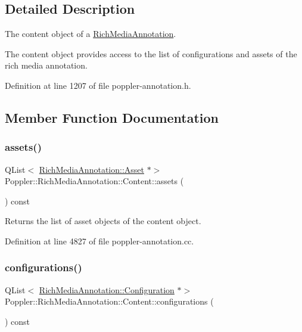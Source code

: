 \subsection{Detailed Description}
The content object of a \hyperlink{class_poppler_1_1_rich_media_annotation}{Rich\+Media\+Annotation}.

The content object provides access to the list of configurations and assets of the rich media annotation. 

Definition at line 1207 of file poppler-\/annotation.\+h.



\subsection{Member Function Documentation}
\mbox{\label{class_poppler_1_1_rich_media_annotation_1_1_content_a64b6bd21fb70aeed088ac1e0ce94eea4}} 
\subsubsection{\texorpdfstring{assets()}{assets()}}
{\footnotesize\ttfamily Q\+List$<$ \hyperlink{class_poppler_1_1_rich_media_annotation_1_1_asset}{Rich\+Media\+Annotation\+::\+Asset} $\ast$$>$ Poppler\+::\+Rich\+Media\+Annotation\+::\+Content\+::assets (\begin{DoxyParamCaption}{ }\end{DoxyParamCaption}) const}

Returns the list of asset objects of the content object. 

Definition at line 4827 of file poppler-\/annotation.\+cc.

\mbox{\label{class_poppler_1_1_rich_media_annotation_1_1_content_aa05b36aa207a96c00abb651c5df80282}} 
\subsubsection{\texorpdfstring{configurations()}{configurations()}}
{\footnotesize\ttfamily Q\+List$<$ \hyperlink{class_poppler_1_1_rich_media_annotation_1_1_configuration}{Rich\+Media\+Annotation\+::\+Configuration} $\ast$$>$ Poppler\+::\+Rich\+Media\+Annotation\+::\+Content\+::configurations (\begin{DoxyParamCaption}{ }\end{DoxyParamCaption}) const}

